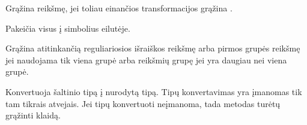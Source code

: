 \documentclass[letterpaper,10pt,lithuanian]{sphinxmanual}
\begin{document}
\begin{fulllineitems}

\pysigstartsignatures
{}
\pysigstopsignatures{}

\begin{fulllineitems}
\label{\detokenize{formules:func.null}}
\pysigstartsignatures
{}
\pysigstopsignatures
\sphinxAtStartPar
Grąžina  reikšmę, jei toliau einančios transformacijos grąžina
.

\end{fulllineitems}


\begin{fulllineitems}
\label{\detokenize{formules:func.replace}}
\pysigstartsignatures
{}
\pysigstopsignatures
\sphinxAtStartPar
Pakeičia visus  į  simbolius eilutėje.

\end{fulllineitems}


\begin{fulllineitems}
\label{\detokenize{formules:func.re}}
\pysigstartsignatures
{}
\pysigstopsignatures
\sphinxAtStartPar
Grąžina atitinkančią reguliariosios išraiškos  reikšmę arba
pirmos grupės reikšmę jei naudojama tik viena grupė arba reikšmių grupę
jei  yra daugiau nei viena grupė.

\end{fulllineitems}


\begin{fulllineitems}
\label{\detokenize{formules:func.cast}}
\pysigstartsignatures
{}
\pysigstopsignatures
\sphinxAtStartPar
Konvertuoja šaltinio tipą į nurodytą  tipą. Tipų konvertavimas yra
įmanomas tik tam tikrais atvejais. Jei tipų konvertuoti neįmanoma, tada
metodas turėtų grąžinti klaidą.


\end{fulllineitems}
\end{fulllineitems}
\end{document}
